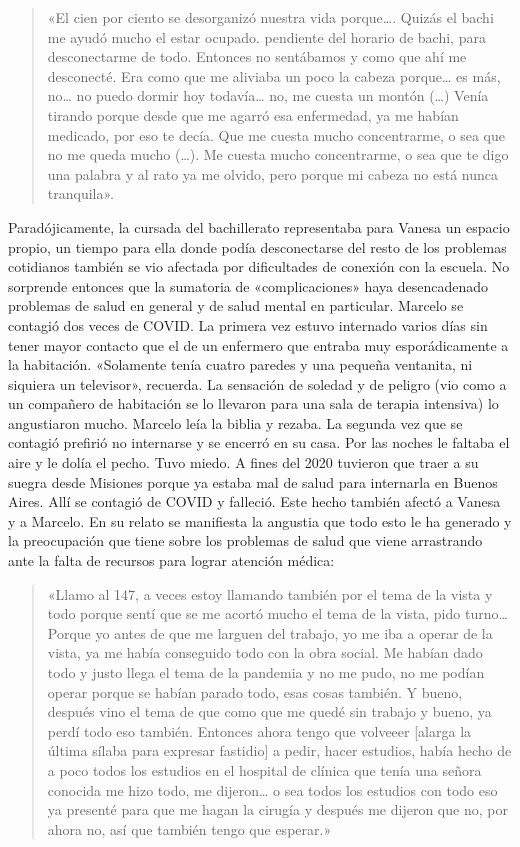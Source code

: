 \begin{quote}
«El cien por ciento se desorganizó nuestra vida porque\ldots. Quizás el bachi me ayudó mucho el estar ocupado. pendiente del horario de bachi, para desconectarme de todo. Entonces no sentábamos y como que ahí me desconecté. Era como que me aliviaba un poco la cabeza porque\ldots{} es más, no\ldots{} no puedo dormir hoy todavía\ldots{} no, me cuesta un montón (\ldots) Venía tirando porque desde que me agarró esa enfermedad, ya me habían medicado, por eso te decía. Que me cuesta mucho concentrarme, o sea que no me queda mucho (\ldots). Me cuesta mucho concentrarme, o sea que te digo una palabra y al rato ya me olvido, pero porque mi cabeza no está nunca tranquila».
\end{quote}

Paradójicamente, la cursada del bachillerato representaba para Vanesa un espacio propio, un tiempo para ella donde podía desconectarse del resto de los problemas cotidianos también se vio afectada por dificultades de conexión con la escuela. No sorprende entonces que la sumatoria de «complicaciones» haya desencadenado problemas de salud en general y de salud mental en particular. Marcelo se contagió dos veces de COVID. La primera vez estuvo internado varios días sin tener mayor contacto que el de un enfermero que entraba muy esporádicamente a la habitación. «Solamente tenía cuatro paredes y una pequeña ventanita, ni siquiera un televisor», recuerda. La sensación de soledad y de peligro (vio como a un compañero de habitación se lo llevaron para una sala de terapia intensiva) lo angustiaron mucho. Marcelo leía la biblia y rezaba. La segunda vez que se contagió prefirió no internarse y se encerró en su casa. Por las noches le faltaba el aire y le dolía el pecho. Tuvo miedo. A fines del 2020 tuvieron que traer a su suegra desde Misiones porque ya estaba mal de salud para internarla en Buenos Aires. Allí se contagió de COVID y falleció. Este hecho también afectó a Vanesa y a Marcelo. En su relato se manifiesta la angustia que todo esto le ha generado y la preocupación que tiene sobre los problemas de salud que viene arrastrando ante la falta de recursos para lograr atención médica:

\begin{quote}
«Llamo al 147, a veces estoy llamando también por el tema de la vista y todo porque sentí que se me acortó mucho el tema de la vista, pido turno\ldots Porque yo antes de que me larguen del trabajo, yo me iba a operar de la vista, ya me había conseguido todo con la obra social. Me habían dado todo y justo llega el tema de la pandemia y no me pudo, no me podían operar porque se habían parado todo, esas cosas también. Y bueno, después vino el tema de que como que me quedé sin trabajo y bueno, ya perdí todo eso también. Entonces ahora tengo que volveeer {[}alarga la última sílaba para expresar fastidio{]} a pedir, hacer estudios, había hecho de a poco todos los estudios en el hospital de clínica que tenía una señora conocida me hizo todo, me dijeron\ldots{} o sea todos los estudios con todo eso ya presenté para que me hagan la cirugía y después me dijeron que no, por ahora no, así que también tengo que esperar.»
\end{quote}

